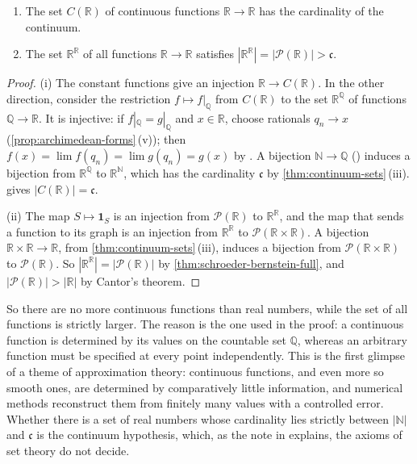 \begin{theorem}
\label{thm:function-sets}
\leavevmode
\begin{enumerate}
\item The set $C(\mathbb R)$ of continuous functions $\mathbb R\to\mathbb R$ has the cardinality of the continuum.
\item The set $\mathbb R^{\mathbb R}$ of all functions $\mathbb R\to\mathbb R$ satisfies $|\mathbb R^{\mathbb R}|=|\mathcal P(\mathbb R)|>\mathfrak c$.
\end{enumerate}
\end{theorem}

\begin{proof}
(i) The constant functions give an injection $\mathbb R\to C(\mathbb R)$. In the other direction, consider the restriction $f\mapsto f|_{\mathbb Q}$ from $C(\mathbb R)$ to the set $\mathbb R^{\mathbb Q}$ of functions $\mathbb Q\to\mathbb R$. It is injective: if $f|_{\mathbb Q}=g|_{\mathbb Q}$ and $x\in\mathbb R$, choose rationals $q_n\to x$ (\cref{prop:archimedean-forms}\,(v)); then $f(x)=\lim f(q_n)=\lim g(q_n)=g(x)$ by . A bijection $\mathbb N\to\mathbb Q$ () induces a bijection from $\mathbb R^{\mathbb Q}$ to $\mathbb R^{\mathbb N}$, which has the cardinality $\mathfrak c$ by \cref{thm:continuum-sets}\,(iii).  gives $|C(\mathbb R)|=\mathfrak c$.

(ii) The map $S\mapsto\mathbf 1_S$ is an injection from $\mathcal P(\mathbb R)$ to $\mathbb R^{\mathbb R}$, and the map that sends a function to its graph is an injection from $\mathbb R^{\mathbb R}$ to $\mathcal P(\mathbb R\times\mathbb R)$. A bijection $\mathbb R\times\mathbb R\to\mathbb R$, from \cref{thm:continuum-sets}\,(iii), induces a bijection from $\mathcal P(\mathbb R\times\mathbb R)$ to $\mathcal P(\mathbb R)$. So $|\mathbb R^{\mathbb R}|=|\mathcal P(\mathbb R)|$ by \cref{thm:schroeder-bernstein-full}, and $|\mathcal P(\mathbb R)|>|\mathbb R|$ by Cantor's theorem.
\end{proof}

So there are no more continuous functions than real numbers, while the set of all functions is strictly larger. The reason is the one used in the proof: a continuous function is determined by its values on the countable set $\mathbb Q$, whereas an arbitrary function must be specified at every point independently. This is the first glimpse of a theme of approximation theory: continuous functions, and even more so smooth ones, are determined by comparatively little information, and numerical methods reconstruct them from finitely many values with a controlled error. Whether there is a set of real numbers whose cardinality lies strictly between $|\mathbb N|$ and $\mathfrak c$ is the continuum hypothesis, which, as the note in  explains, the axioms of set theory do not decide.

